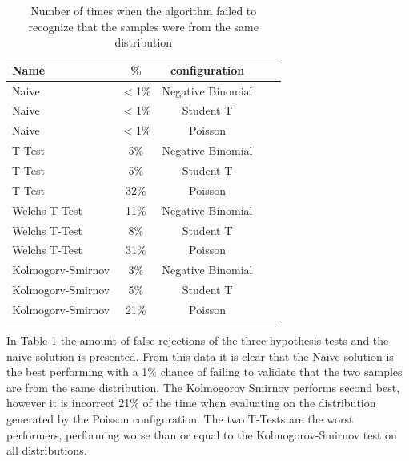 \begin{table}[htp]
  \centering
  \begin{tabular}{lcccc}
    {\textbf Name}    & {\textbf \%} & {\textbf configuration} \\
    \hline
    Naive             & $<$1\%       & Negative Binomial       \\
    Naive             & $<$1\%       & Student T               \\
    Naive             & $<$1\%       & Poisson                 \\
    \hline
    T-Test            & 5\%          & Negative Binomial       \\
    T-Test            & 5\%          & Student T               \\
    T-Test            & 32\%         & Poisson                 \\
    \hline
    Welchs T-Test     & 11\%         & Negative Binomial       \\
    Welchs T-Test     & 8\%          & Student T               \\
    Welchs T-Test     & 31\%         & Poisson                 \\
    \hline
    Kolmogorv-Smirnov & 3\%          & Negative Binomial       \\
    Kolmogorv-Smirnov & 5\%          & Student T               \\
    Kolmogorv-Smirnov & 21\%         & Poisson                 \\
    \hline
  \end{tabular}
  \caption{Number of times when the algorithm failed to recognize that the samples were from the same distribution}
  \label{tab:false_rejects}
\end{table}

In Table \ref{tab:false_rejects} the amount of false rejections of the three hypothesis tests and the naive solution is presented. From this data it is clear that the Naive solution is the best performing with a 1\% chance of failing to validate that the two samples are from the same distribution. The Kolmogorov Smirnov performs second best, however it is incorrect 21\% of the time when evaluating on the distribution generated by the Poisson configuration. The two T-Tests are the worst performers, performing worse than or equal to the Kolmogorov-Smirnov test on all distributions.

